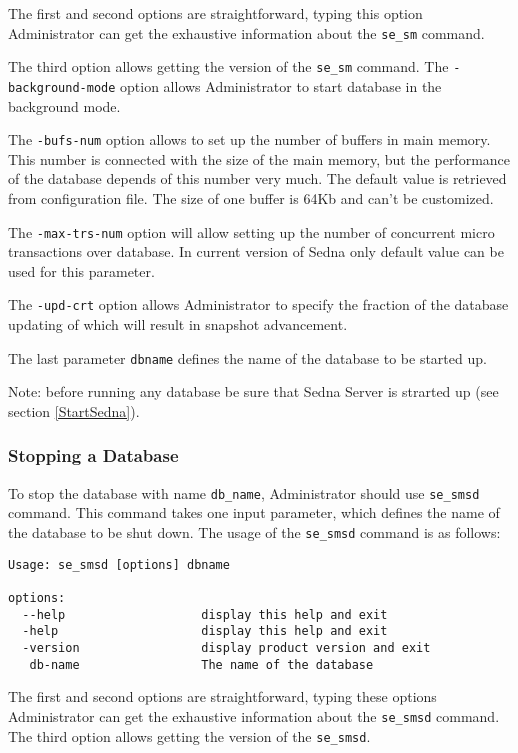 \documentclass[a4paper,12pt]{article}
\begin{document}
The first and second options are straightforward, typing this option Administrator can get the exhaustive information about the \verb!se_sm! command.

The third option allows getting the version of the \verb!se_sm! command.
The \verb!-background-mode! option allows Administrator to start database in the background mode.

The \verb!-bufs-num! option allows to set up the number of buffers in main memory. This number is connected with the size of the main memory, but the performance of the database depends of this number very much. The default value is retrieved from configuration file. The size of one buffer is 64Kb and can't be customized.

The \verb!-max-trs-num! option will allow setting up the number of concurrent micro transactions over database. In current version of Sedna only default value can be used for this parameter.

The \verb!-upd-crt! option allows Administrator to specify the fraction of the database updating of which will result in snapshot advancement.

The last parameter \verb!dbname!  defines the name of the database to be started up. 


Note: before running any database be sure that Sedna Server is strarted up (see section \ref{StartSedna}).

\subsubsection{Stopping a Database}
\label{StopDB}

To stop the database with name \verb!db_name!, Administrator should use \verb!se_smsd! command. This command takes one input parameter, which defines the name of the database to be shut down. The usage of the \verb!se_smsd! command is as follows:

\begin{verbatim}
Usage: se_smsd [options] dbname

options:
  --help                   display this help and exit
  -help                    display this help and exit
  -version                 display product version and exit
   db-name                 The name of the database
\end{verbatim}

The first and second options are straightforward, typing these options Administrator can get the exhaustive information about the \verb!se_smsd! command.
The third option allows getting the version of the \verb!se_smsd!.
\end{document}
